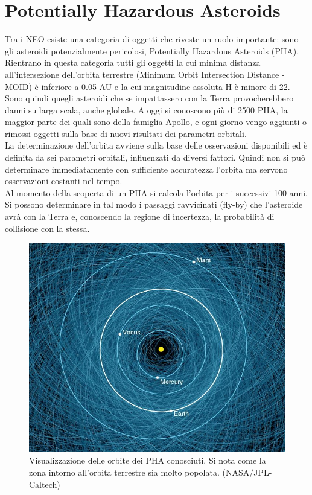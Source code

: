 \section{Potentially Hazardous Asteroids}\label{sec:pha}
Tra i NEO esiste una categoria di oggetti che riveste un ruolo importante: sono gli asteroidi potenzialmente pericolosi, Potentially Hazardous Asteroids (PHA). Rientrano in questa categoria tutti gli oggetti la cui minima distanza all'intersezione dell'orbita terrestre (Minimum Orbit Intersection Distance - MOID) è inferiore a 0.05 AU e la cui magnitudine assoluta H è minore di 22. Sono quindi quegli asteroidi che se impattassero con la Terra provocherebbero danni su larga scala, anche globale. A oggi si conoscono più di 2500 PHA, la maggior parte dei quali sono della famiglia Apollo, e ogni giorno vengo aggiunti o rimossi oggetti sulla base di nuovi risultati dei parametri orbitali.\\
La determinazione dell'orbita avviene sulla base delle osservazioni disponibili ed è definita da sei parametri orbitali, influenzati da diversi fattori. Quindi non si può determinare immediatamente con sufficiente accuratezza l'orbita ma servono osservazioni costanti nel tempo.\\
Al momento della scoperta di un PHA si calcola l'orbita per i successivi 100 anni. Si possono determinare in tal modo i passaggi ravvicinati (fly-by) che l'asteroide avrà con la Terra e, conoscendo la regione di incertezza, la probabilità di collisione con la stessa.

\begin{figure}
    \centering
    \includegraphics[scale=0.35]{figure/pha_map.jpg}
    \caption[Visualizzazione delle orbite dei PHA conosciuti.]{Visualizzazione delle orbite dei PHA conosciuti. Si nota come la zona intorno all'orbita terrestre sia molto popolata. (NASA/JPL-Caltech)}
    \label{fig:pha_map}
\end{figure}

